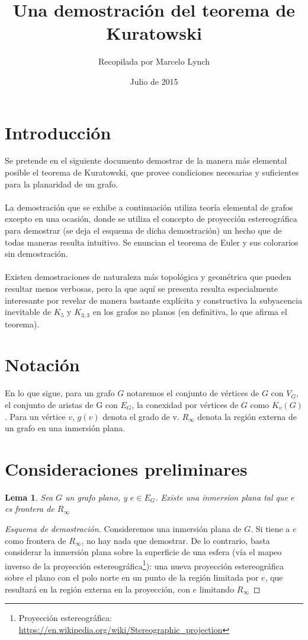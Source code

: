 \documentclass{article}
\title{Una demostración del teorema de Kuratowski}
\author{Recopilada por Marcelo Lynch}
\date{Julio de 2015}
\newtheorem{lemma}{Lema}
\begin{document}
\maketitle

\section*{Introducción}
Se pretende en el siguiente documento demostrar de la manera más elemental posible el teorema de Kuratowski, que provee condiciones necesarias y suficientes para la planaridad de un grafo. \\ \\La demostración que se exhibe a continuación utiliza teoría elemental de grafos excepto en una ocasión, donde se utiliza el concepto de proyección estereográfica para demostrar (se deja el esquema de dicha demostración) un hecho que de todas maneras resulta intuitivo. Se enuncian el teorema de Euler y sus colorarios sin demostración. \\ \\ Existen demostraciones de naturaleza más topológica y geométrica que pueden resultar menos verbosas, pero la que aquí se presenta resulta especialmente interesante por revelar de manera bastante explícita y constructiva la subyacencia inevitable de $K_5$ y $K_{3,3}$ en los grafos no planos (en definitiva, lo que afirma el teorema).



\section*{Notación}
En lo que sigue, para un grafo $G$ notaremos el conjunto de vértices de $G$ con $V_G$, el conjunto de aristas de G con $E_G$, la conexidad por vértices de $G$ como $K_v(G)$. Para un vértice $v$, $g(v)$ denota el grado de v. $R_\infty$ denota la región externa de un grafo en una inmersión plana.

\section*{Consideraciones preliminares}

\begin{lemma}
Sea $G$ un grafo plano, y $e \in E_G$. Existe una inmersion plana tal que $e$ es frontera de $R_\infty$
\end{lemma}
 
\begin{proof}[Esquema de demostración]
Consideremos una inmersión plana de $G$. Si tiene a $e$ como frontera de $R_\infty$, no hay nada que demostrar. De lo contrario, basta considerar la inmersión plana sobre la superficie de una esfera (vía el mapeo inverso de la proyección estereográfica\footnote{Proyección estereográfica: \url{https://en.wikipedia.org/wiki/Stereographic_projection}}): una nueva proyección estereográfica sobre el plano con el polo norte en un punto de la región limitada por $e$, que resultará en la región externa en la proyección, con $e$ limitando $R_\infty$
\end{proof}
\end{document}
